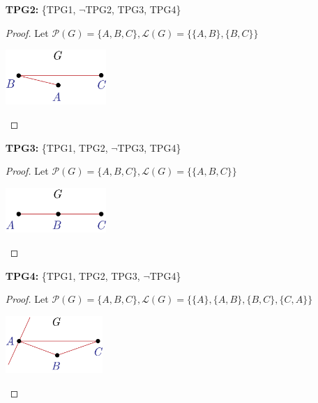 \documentclass[a4paper, 10pt]{exam}
\begin{document}
\begin{questions}
\begin{enumerate}
\begin{proof}
\begin{center}
            \end{center}
        \end{proof}
      \item[\textbf{TPG2:}] \{TPG1, $\neg$TPG2, TPG3, TPG4\}
      \begin{proof}
            Let $\mathscr{P}(G) = \{A, B, C\}, \mathscr{L}(G) = \{\{A, B\},\{B, C\} \}$
            \begin{center}
                \includegraphics[width=0.3\textwidth]{3.2.png} \\
                  
            \end{center}
        \end{proof}
      \item[\textbf{TPG3:}] \{TPG1, TPG2, $\neg$TPG3, TPG4\}
      \begin{proof}
            Let $\mathscr{P}(G) = \{A, B, C\}, \mathscr{L}(G) = \{\{A, B, C\} \}$
            \begin{center}
                \includegraphics[width=0.3\textwidth]{3.3.png} \\
                  
            \end{center}
        \end{proof}
      \item[\textbf{TPG4:}] \{TPG1, TPG2, TPG3, $\neg$TPG4\}
      \begin{proof}
            Let $\mathscr{P}(G) = \{A, B, C\}, \mathscr{L}(G) = \{ \{A\}, \{A, B\},\{B, C\}, \{C, A\} \}$
            \begin{center}
                \includegraphics[width=0.29\textwidth]{3.4.png} \\
                  
            \end{center}
        \end{proof}
    \end{enumerate}

\end{questions}
\end{document}

